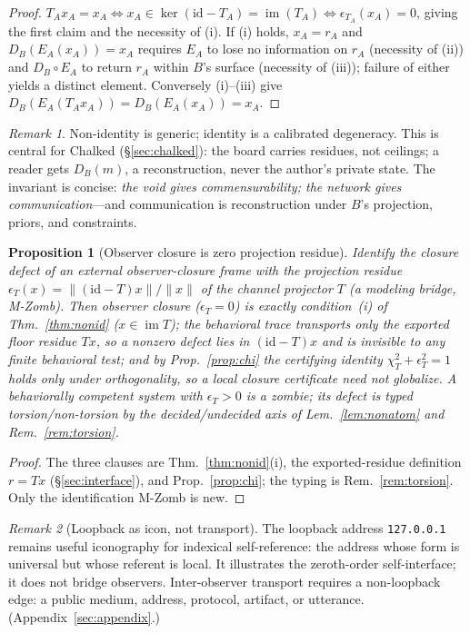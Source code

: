 \documentclass[11pt]{article}
\newtheorem{proposition}{Proposition}
\theoremstyle{definition}
\theoremstyle{remark}
\newtheorem*{remark}{Remark}
\begin{document}
\begin{proof}
$T_Ax_A=x_A\iff x_A\in\ker(\mathrm{id}-T_A)=\operatorname{im}(T_A)\iff\epsilon_{T_A}(x_A)=0$, giving
the first claim and the necessity of (i). If (i) holds, $x_A=r_A$ and
$D_B(E_A(x_A))=x_A$ requires $E_A$ to lose no information on $r_A$ (necessity of (ii)) and
$D_B\circ E_A$ to return $r_A$ within $B$'s surface (necessity of (iii)); failure of either yields a
distinct element. Conversely (i)--(iii) give $D_B(E_A(T_Ax_A))=D_B(E_A(x_A))=x_A$.
\end{proof}

\begin{remark}
Non-identity is generic; identity is a calibrated degeneracy. This is central for Chalked
(\S\ref{sec:chalked}): the board carries residues, not ceilings; a reader gets $D_B(m)$, a
reconstruction, never the author's private state. The invariant is concise: \emph{the void gives
commensurability; the network gives communication}---and communication is reconstruction under $B$'s
projection, priors, and constraints.
\end{remark}

\begin{proposition}[Observer closure is zero projection residue]\label{prop:zombie}
Identify the closure defect of an external observer-closure frame with the projection residue
$\epsilon_T(x)=\|(\mathrm{id}-T)x\|/\|x\|$ of the channel projector $T$ (a modeling bridge, M-Zomb).
Then observer closure ($\epsilon_T=0$) is exactly condition~(i) of Thm.~\ref{thm:nonid}
($x\in\operatorname{im}T$); the behavioral trace transports only the exported floor residue $Tx$, so a
nonzero defect lies in $(\mathrm{id}-T)x$ and is invisible to any finite behavioral test; and by
Prop.~\ref{prop:chi} the certifying identity $\chi_T^2+\epsilon_T^2=1$ holds only under orthogonality,
so a local closure certificate need not globalize. A behaviorally competent system with $\epsilon_T>0$
is a \emph{zombie}; its defect is typed torsion/non-torsion by the decided/undecided axis of
Lem.~\ref{lem:nonatom} and Rem.~\ref{rem:torsion}.
\end{proposition}
\begin{proof}
The three clauses are Thm.~\ref{thm:nonid}(i), the exported-residue definition $r=Tx$
(\S\ref{sec:interface}), and Prop.~\ref{prop:chi}; the typing is Rem.~\ref{rem:torsion}. Only the
identification M-Zomb is new.
\end{proof}

\begin{remark}[Loopback as icon, not transport]
The loopback address \texttt{127.0.0.1} remains useful iconography for indexical self-reference: the
address whose form is universal but whose referent is local. It illustrates the zeroth-order
self-interface; it does not bridge observers. Inter-observer transport requires a non-loopback edge:
a public medium, address, protocol, artifact, or utterance. (Appendix~\ref{sec:appendix}.)
\end{remark}
\end{document}
